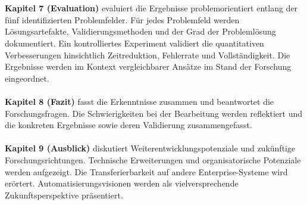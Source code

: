 \\\\
\textbf{Kapitel 7 (Evaluation)} evaluiert die Ergebnisse problemorientiert entlang der fünf identifizierten Problemfelder. Für jedes Problemfeld werden Lösungsartefakte, Validierungsmethoden und der Grad der Problemlösung dokumentiert. Ein kontrolliertes Experiment validiert die quantitativen Verbesserungen hinsichtlich Zeitreduktion, Fehlerrate und Vollständigkeit. Die Ergebnisse werden im Kontext vergleichbarer Ansätze im Stand der Forschung eingeordnet.
\\\\
\textbf{Kapitel 8 (Fazit)} fasst die Erkenntnisse zusammen und beantwortet die Forschungsfragen. Die Schwierigkeiten bei der Bearbeitung werden reflektiert und die konkreten Ergebnisse sowie deren Validierung zusammengefasst.
\\\\
\textbf{Kapitel 9 (Ausblick)} diskutiert Weiterentwicklungspotenziale und zukünftige Forschungsrichtungen. Technische Erweiterungen und organisatorische Potenziale werden aufgezeigt. Die Transferierbarkeit auf andere Enterprise-Systeme wird erörtert. Automatisierungsvisionen werden als vielversprechende Zukunftsperspektive präsentiert.